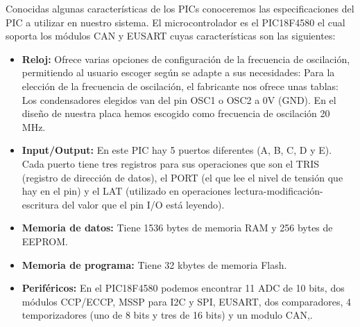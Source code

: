 Conocidas algunas características de los PICs conoceremos las especificaciones del PIC a utilizar en nuestro sistema. El microcontrolador es el PIC18F4580 el cual soporta los módulos CAN y EUSART cuyas características son las siguientes:
\begin{itemize}
\item {\textbf{Reloj:}} Ofrece varias opciones de configuración de la frecuencia de oscilación, permitiendo al usuario escoger según se adapte a sus necesidades:
Para la elección de la frecuencia de oscilación, el fabricante nos ofrece unas tablas:
Los condensadores elegidos van del pin OSC1 o OSC2 a 0V (GND). En el diseño de nuestra placa hemos escogido como frecuencia de oscilación 20 MHz.
\item {\textbf{Input/Output:}} En este PIC hay 5 puertos diferentes (A, B, C, D y E). Cada puerto tiene tres registros para sus operaciones que son el TRIS (registro de dirección de datos), el PORT (el que lee el nivel de tensión que hay en el pin) y el LAT (utilizado en operaciones lectura-modificación-escritura del valor que el pin I/O está leyendo). 

\item {\textbf{Memoria de datos:}} Tiene 1536 bytes de memoria RAM y 256 bytes de EEPROM.
\item {\textbf{Memoria de programa:}} Tiene 32 kbytes de memoria Flash.
\item {\textbf{Periféricos:}} En el PIC18F4580 podemos encontrar 11 ADC de 10 bits, dos módulos CCP/ECCP, MSSP para I2C y SPI, EUSART, dos comparadores, 4 temporizadores (uno de 8 bits y tres de 16 bits) y un modulo CAN,\cite{DaP}.

\end{itemize}

